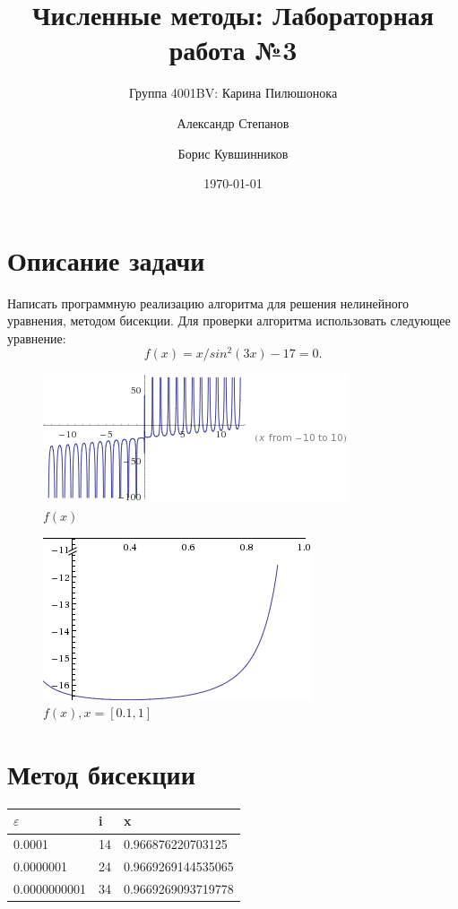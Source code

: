 \documentclass{article}
\title{Численные методы: Лабораторная работа №3}
\author{Группа 4001BV: Карина Пилюшонока \and Александр Степанов \and Борис
Кувшинников} \date \today
\begin{document}
\maketitle
\newpage
\tableofcontents
\newpage
\section{Описание задачи}
Написать программную реализацию алгоритма для решения нелинейного уравнения,
методом бисекции. Для проверки алгоритма использовать следующее уравнение:
\begin{displaymath}
	f(x) = x / sin^2(3x) - 17 = 0 .
\end{displaymath}

\begin{figure}[h]
	\includegraphics{lab3_1.png}
	\caption{$f(x)$}
	\label{lab3_1}
\end{figure}

\begin{figure}[h]
	\includegraphics{lab3_2.png}
	\caption{$f(x), x=[0.1, 1]$}
	\label{lab3_2}
\end{figure}

\section{Метод бисекции}

\begin{table}[!h]
\begin{tabular}{l|l|l}
	$\varepsilon$  	& i 	& x \\
	\hline
	0.0001 			& 14& 0.966876220703125\\
	0.0000001		& 24& 0.9669269144535065\\
	0.0000000001	& 34& 0.9669269093719778\\
\end{tabular}
\end{table}
\end{document}
